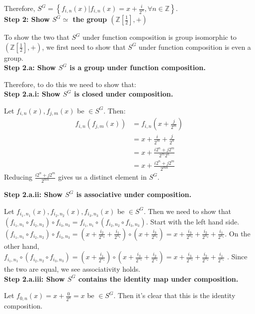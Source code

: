 \documentclass[12pt]{article}%
\newcommand{\Z}{\mathbb{Z}}
\begin{document}
Therefore, $S^G=\left\{f_{i,n}(x)|f_{i,n}(x)=x+\frac{i}{2^{n}}, \forall n\in \Z\right\}$.\\

\textbf{Step 2: Show $S^G\simeq$  the group $\left(\Z\left[\frac{1}{2}\right],+\right)$}

To show the two that $S^G$ under function composition is group isomorphic to
$\left(\Z\left[\frac{1}{2}\right],+\right)$, we first need to show that $S^G$ under function composition
is even a group. \\

\textbf{Step 2.a: Show $S^G$ is a group under function composition.}

Therefore, to do this we need to show that: \\

\textbf{Step 2.a.i: Show $S^G$ is closed under composition.}

Let $f_{i,n}(x), f_{j,m}(x)$ be $\in S^G$. Then:
\begin{align*}
f_{i,n}(f_{j,m}(x))
&=f_{i,n}(x+\frac{j}{2^{m}}) \\
&=x+\frac{i}{2^{m}}+\frac{j}{2^{n}} \\
&=x+\frac{i2^{n}+j2^{m}}{2^{m}2^{n}} \\
&=x+\frac{i2^{n}+j2^{m}}{2^{mn}}
\end{align*}
Reducing $\frac{i2^{n}+j2^{m}}{2^{mn}}$ gives us a distinct element in $S^G$.

\textbf{Step 2.a.ii: Show $S^G$ is associative under composition.}

Let $f_{i_1,n_1}(x), f_{i_2,n_2}(x), f_{i_3,n_3}(x)$ be $\in S^G$. Then we need to show that
$(f_{i_1,n_1}\circ f_{i_2,n_2}) \circ f_{i_3,n_3}=f_{i_1,n_1}\circ (f_{i_2,n_2} \circ f_{i_3,n_3})$.
Start with the left hand side.
$(f_{i_1,n_1}\circ f_{i_2,n_2}) \circ f_{i_3,n_3} = (x+\frac{i_2}{2^{n_2}}+\frac{i_1}{2^{n_1}}) \circ (x+\frac{i_3}{2^{n_3}}) = x+\frac{i_3}{2^{n_3}}+\frac{i_2}{2^{n_2}}+\frac{i_1}{2^{n_1}}$. On the other
hand, $f_{i_1,n_1}\circ (f_{i_2,n_2} \circ f_{i_3,n_3})=(x+\frac{i_1}{2^{n_1}})\circ (x+\frac{i_3}{2^{n_3}}+\frac{i_2}{2^{n_2}})=x+\frac{i_3}{2^{n_3}}+\frac{i_2}{2^{n_2}}+\frac{i_1}{2^{n_1}}$
. Since the two are equal, we see associativity holds. \\

\textbf{Step 2.a.iii: Show $S^G$ contains the identity map under composition.}

Let $f_{0,n}(x)=x+\frac{0}{2^n}=x$ be $\in S^G$.  Then it's clear that this is the identity composition. \\
\end{document}
